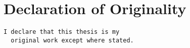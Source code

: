 %
%
%

\chapter*{Declaration of Originality}

\begin{center}
\texttt{I declare that this thesis is my\\
        ~~original work except where stated.\\
        ~\\
        \hspace*{3cm}\dotfill\hspace*{3cm}}

\end{center}
